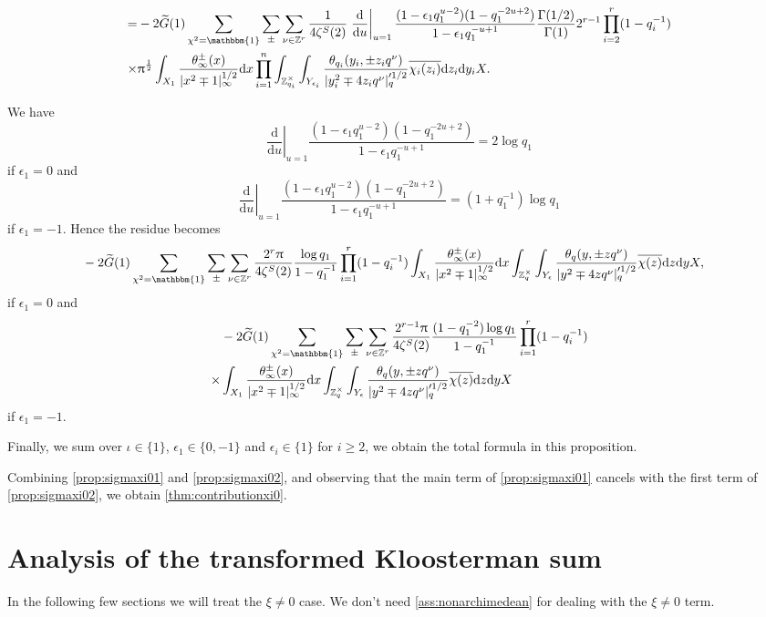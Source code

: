 \documentclass[10pt,oneside,reqno]{amsart}
\makeatletter
\newcommand\rmd{\mathrm{d}}
\newcommand\ZZ{\mathbb{Z}}
\newcommand\triv{\mathbbm{1}}
\renewcommand\geq{\geqslant}
\theoremstyle{THEOREM}
\theoremstyle{DEFINITION}
\theoremstyle{EXERCISE}
\numberwithin{equation}{section}
\renewenvironment{proof}[1][\proofname]{\par
  \vspace{-6pt}
  \pushQED{\qed}
  \normalfont \topsep6\p@\@plus6\p@\relax
  \trivlist
  \item[\hskip\labelsep\rmfamily\bfseries
    #1\@addpunct{:}]\ignorespaces
}{
  \popQED\endtrivlist\@endpefalse
  \vspace{-6pt}
}
\makeatother
\begin{document}
\begin{proof}
\begin{align*}
=&-2\widetilde{G}(1)\sum_{\chi^2=\triv}\sum_{\pm}\sum_{\nu\in \ZZ^r}\frac{1}{4\zeta^S(2)}\left.\frac{\rmd}{\rmd u}\right|_{u=1}\frac{(1-\epsilon_1 q_1^{u-2})(1-q_1^{-2u+2})}{1-\epsilon_1q_1^{-u+1}} \frac{\Gamma(1/2)}{\Gamma(1)}2^{r-1}\prod_{i=2}^{r}(1-q_i^{-1})\\
\times& \uppi^{\frac12}\int_{X_1}\frac{\theta_\infty^\pm(x)}{|x^2\mp 1|_\infty^{1/2}}\rmd x \prod_{i=1}^{n}\int_{\ZZ_{q_i}^\times}\int_{Y_{\epsilon_i}} \frac{\theta_{q_i}(y_i,\pm z_iq^\nu)}{|y_i^2\mp 4z_iq^\nu|_q'^{1/2}}\overline{\chi_i(z_i)}\rmd z_i\rmd y_i X.
\end{align*}

We have
\[
\left.\frac{\rmd}{\rmd u}\right|_{u=1}\frac{(1-\epsilon_1 q_1^{u-2})(1-q_1^{-2u+2})}{1-\epsilon_1q_1^{-u+1}}=2\log q_1
\]
if $\epsilon_1=0$ and
\[
\left.\frac{\rmd}{\rmd u}\right|_{u=1}\frac{(1-\epsilon_1 q_1^{u-2})(1-q_1^{-2u+2})}{1-\epsilon_1q_1^{-u+1}}=(1+q_1^{-1})\log q_1
\]
if $\epsilon_1=-1$. Hence the residue becomes
\begin{align*}
&-2\widetilde{G}(1)\sum_{\chi^2=\triv}\sum_{\pm}\sum_{\nu\in \ZZ^r}\frac{2^{r}\uppi}{4\zeta^S(2)}\frac{\log q_1}{1-q_1^{-1}}\prod_{i=1}^{r}(1-q_i^{-1})\int_{X_1}\frac{\theta_\infty^\pm(x)}{|x^2\mp 1|_\infty^{1/2}}\rmd x \int_{\ZZ_{q}^\times}\int_{Y_{\epsilon}} \frac{\theta_{q}(y,\pm zq^\nu)}{|y^2\mp 4zq^\nu|_q'^{1/2}}\overline{\chi(z)}\rmd z\rmd y X,
\end{align*}
if $\epsilon_1=0$ and
\begin{align*}
&-2\widetilde{G}(1)\sum_{\chi^2=\triv}\sum_{\pm}\sum_{\nu\in \ZZ^r}\frac{2^{r-1}\uppi}{4\zeta^S(2)}\frac{(1-q_1^{-2})\log q_1}{1-q_1^{-1}}\prod_{i=1}^{r}(1-q_i^{-1})\\
\times&\int_{X_1}\frac{\theta_\infty^\pm(x)}{|x^2\mp 1|_\infty^{1/2}}\rmd x \int_{\ZZ_{q}^\times}\int_{Y_{\epsilon}} \frac{\theta_{q}(y,\pm zq^\nu)}{|y^2\mp 4zq^\nu|_q'^{1/2}}\overline{\chi(z)}\rmd z\rmd y X
\end{align*}
if $\epsilon_1=-1$.

Finally, we sum over $\iota\in \{1\}$, $\epsilon_1\in \{0,-1\}$ and $\epsilon_i\in \{1\}$ for $i\geq 2$, we obtain the total formula in this proposition.
\end{proof}

Combining \autoref{prop:sigmaxi01} and \autoref{prop:sigmaxi02}, and observing that the main term of \autoref{prop:sigmaxi01} cancels with the first term of \autoref{prop:sigmaxi02}, we obtain \autoref{thm:contributionxi0}.

\section{Analysis of the transformed Kloosterman sum}
In the following few sections we will treat the $\xi\neq 0$ case. We don't need \autoref{ass:nonarchimedean} for dealing with the $\xi\neq 0$ term.
\end{document}
